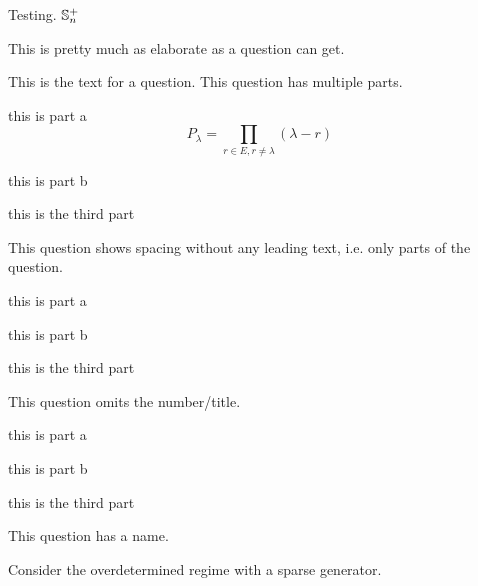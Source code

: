 \documentclass{assignment}
\begin{document}

Testing.
\R \N \Com \Sym \Spp $\mathbb{S}^+_n$

This is pretty much as elaborate as a question can get.
\begin{question}[1.3]
    This is the text for a question. This question has multiple parts.
    \begin{qparts}
      \item this is part a
        $$
        P_\lambda = \prod_{r\in E, r\neq\lambda}(\lambda - r)
        $$
      \item this is part b
      \item this is the third part
    \end{qparts}
\end{question}

This question shows spacing without any leading text, i.e. only parts of the question.
\begin{question}[1.3]
    \begin{qparts}
      \item this is part a
      \item this is part b
      \item this is the third part
    \end{qparts}
\end{question}

This question omits the number/title.
\begin{question}
    \begin{qparts}
      \item this is part a
      \item this is part b
      \item this is the third part
    \end{qparts}
\end{question}

This question has a name.
\begin{question}
  Consider the overdetermined regime with a sparse generator.
\end{question}
\end{document}
